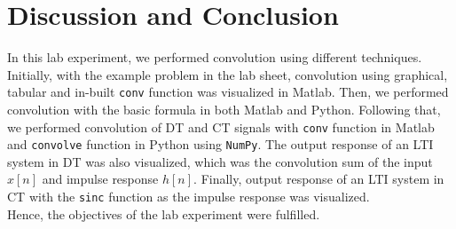 \documentclass{lab_sheet}
\begin{document}
\section{Discussion and Conclusion}
In this lab experiment, we performed convolution using different techniques. Initially, with the example problem in the lab sheet, convolution using graphical, tabular and in-built \texttt{conv} function was visualized in Matlab. Then, we performed convolution with the basic formula in both Matlab and Python. Following that, we performed convolution of DT and CT signals with \texttt{conv} function in Matlab and \texttt{convolve} function in Python using \texttt{NumPy}. The output response of an LTI system in DT was also visualized, which was the convolution sum of the input $x[n]$ and impulse response $h[n]$. Finally, output response of an LTI system in CT with the \texttt{sinc} function as the impulse response was visualized.\\
Hence, the objectives of the lab experiment were fulfilled.
\end{document}
